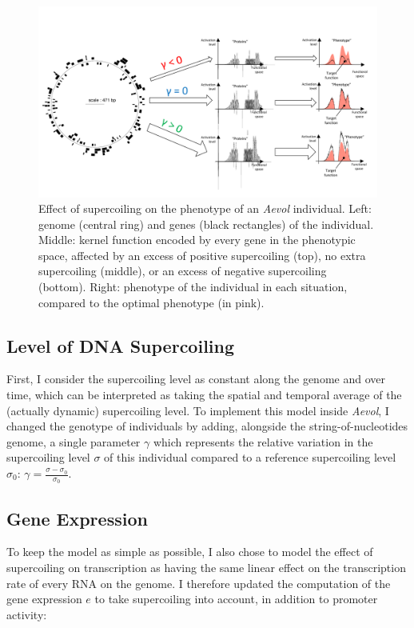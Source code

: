 \begin{figure}
\includegraphics[width=\textwidth]{aevol/images/supercoiling_aevol.pdf}
\caption[Effect of supercoiling on the phenotype of an individual in \emph{Aevol}]{Effect of supercoiling on the phenotype of an \emph{Aevol} individual.
Left: genome (central ring) and genes (black rectangles) of the individual.
Middle: kernel function encoded by every gene in the phenotypic space, affected by an excess of positive supercoiling (top), no extra supercoiling (middle), or an excess of negative supercoiling (bottom).
Right: phenotype of the individual in each situation, compared to the optimal phenotype (in pink).}
\label{fig:aevol:sc_phenotype}
\end{figure}

\subsection{Level of DNA Supercoiling}
First, I consider the supercoiling level as constant along the genome and over time, which can be interpreted as taking the spatial and temporal average of the (actually dynamic) supercoiling level.
To implement this model inside \emph{Aevol}, I changed the genotype of individuals by adding, alongside the string-of-nucleotides genome, a single parameter $\gamma$ which represents the relative variation in the supercoiling level $\sigma$ of this individual compared to a reference supercoiling level $\sigma_0$: $\gamma = \frac{\sigma-\sigma_0}{\sigma_0}$.

\subsection{Gene Expression}
To keep the model as simple as possible, I also chose to model the effect of supercoiling on transcription as having the same linear effect on the transcription rate of every RNA on the genome.
I therefore updated the computation of the gene expression $e$ to take supercoiling into account, in addition to promoter activity:

